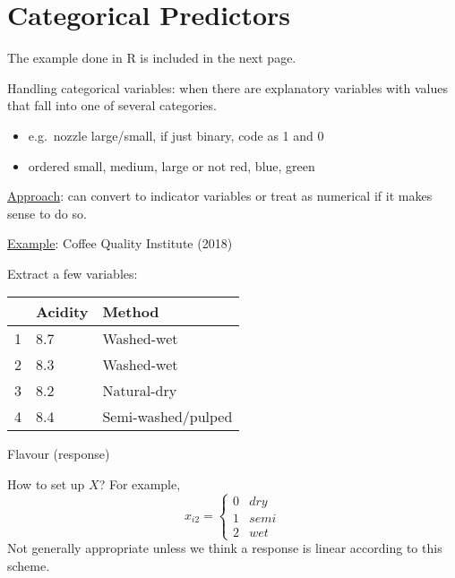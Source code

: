 \section{Categorical Predictors}
The example done in R is included in the next page.


Handling categorical variables: when there are explanatory
variables with values that fall into one of
several categories.
\begin{itemize}
    \item e.g.\ nozzle large/small, if just binary,
          code as 1 and 0
    \item ordered small, medium, large or not
          red, blue, green
\end{itemize}
\underline{Approach}: can convert to indicator variables
or treat as numerical if it makes sense to do so.

\underline{Example}: Coffee Quality Institute (2018)

Extract a few variables:
\begin{table}[H]
    \centering
    \begin{tabularx}{0.7\linewidth}{@{}YYY@{}}
          & Acidity & Method             \\
         & 8.7     & Washed-wet         \\
        2 & 8.3     & Washed-wet         \\
        3 & 8.2     & Natural-dry        \\
        4 & 8.4     & Semi-washed/pulped
    \end{tabularx}
\end{table}
Flavour (response)

How to set up $ X $? For example,
\[ x_{i2}=\begin{cases*}
        0 & dry\\
        1 & semi\\
        2 & wet
    \end{cases*} \]
Not generally appropriate unless we think
a response is linear according to this scheme.


